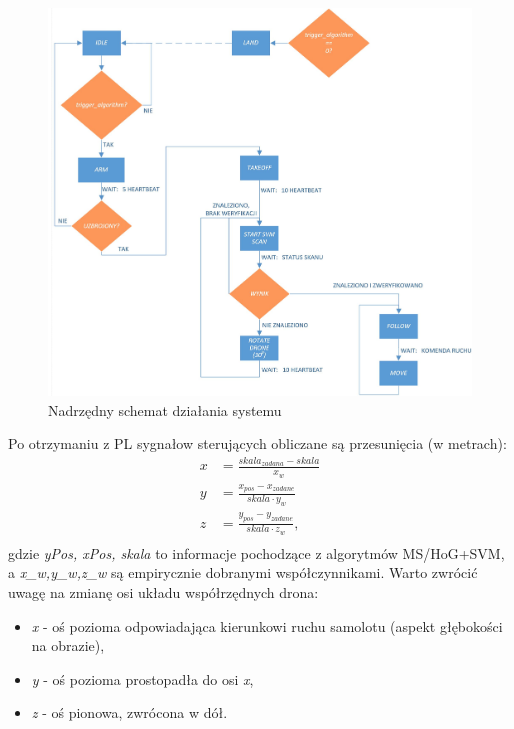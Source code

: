 \begin{figure}[h]
	\centering
	\includegraphics[width=16cm]{5_PS_FSM.jpg}
	\caption{Nadrzędny schemat działania systemu}
	\label{fig:PL_FSM_sch}
\end{figure}

Po otrzymaniu z PL sygnałow sterujących obliczane są przesunięcia (w metrach):
\begin{equation}
\left.\begin{aligned}
x&= \frac{skala_{zadana}-skala}{x_w}\\
y&= \frac{x_{pos}-x_{zadane}}{skala\cdot y_w}\\
z&= \frac{y_{pos}-y_{zadane}}{skala\cdot z_w},\\
\end{aligned}\right.
\end{equation}
gdzie \textit{yPos, xPos, skala} to informacje pochodzące z algorytmów MS/HoG+SVM, a \textit{x_w,y_w,z_w} są empirycznie dobranymi współczynnikami. Warto zwrócić uwagę na zmianę osi układu współrzędnych drona:
\begin{itemize}
	\item \textit{x} - oś pozioma odpowiadająca kierunkowi ruchu samolotu (aspekt głębokości na obrazie),
	\item \textit{y} - oś pozioma prostopadła do osi \textit{x},
	\item \textit{z} - oś pionowa, zwrócona w dół.
\end{itemize}